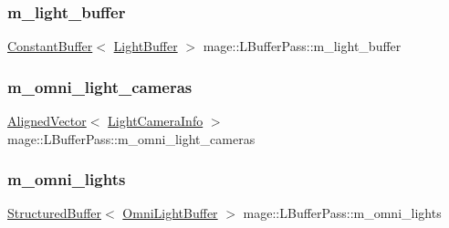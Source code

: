\hypertarget{structmage_1_1_l_buffer_pass_a5946e3e691734567824644f8d1ec77b9}{}\label{structmage_1_1_l_buffer_pass_a5946e3e691734567824644f8d1ec77b9} 
\subsubsection{\texorpdfstring{m\+\_\+light\+\_\+buffer}{m\_light\_buffer}}
{\footnotesize\ttfamily \hyperlink{classmage_1_1_constant_buffer}{Constant\+Buffer}$<$ \hyperlink{structmage_1_1_light_buffer}{Light\+Buffer} $>$ mage\+::\+L\+Buffer\+Pass\+::m\+\_\+light\+\_\+buffer\hspace{0.3cm}{\ttfamily [private]}}

\hypertarget{structmage_1_1_l_buffer_pass_ae8474ced9c3b762ffba3f1d859b9396a}{}\label{structmage_1_1_l_buffer_pass_ae8474ced9c3b762ffba3f1d859b9396a} 
\subsubsection{\texorpdfstring{m\+\_\+omni\+\_\+light\+\_\+cameras}{m\_omni\_light\_cameras}}
{\footnotesize\ttfamily \hyperlink{namespacemage_a8664bfb5ce2179fc64eae9f82c8a5ba8}{Aligned\+Vector}$<$ \hyperlink{structmage_1_1_light_camera_info}{Light\+Camera\+Info} $>$ mage\+::\+L\+Buffer\+Pass\+::m\+\_\+omni\+\_\+light\+\_\+cameras\hspace{0.3cm}{\ttfamily [private]}}

\hypertarget{structmage_1_1_l_buffer_pass_afc2754b9d3a3b1c2171cd1a6e5b2349d}{}\label{structmage_1_1_l_buffer_pass_afc2754b9d3a3b1c2171cd1a6e5b2349d} 
\subsubsection{\texorpdfstring{m\+\_\+omni\+\_\+lights}{m\_omni\_lights}}
{\footnotesize\ttfamily \hyperlink{classmage_1_1_structured_buffer}{Structured\+Buffer}$<$ \hyperlink{structmage_1_1_omni_light_buffer}{Omni\+Light\+Buffer} $>$ mage\+::\+L\+Buffer\+Pass\+::m\+\_\+omni\+\_\+lights\hspace{0.3cm}{\ttfamily [private]}}

